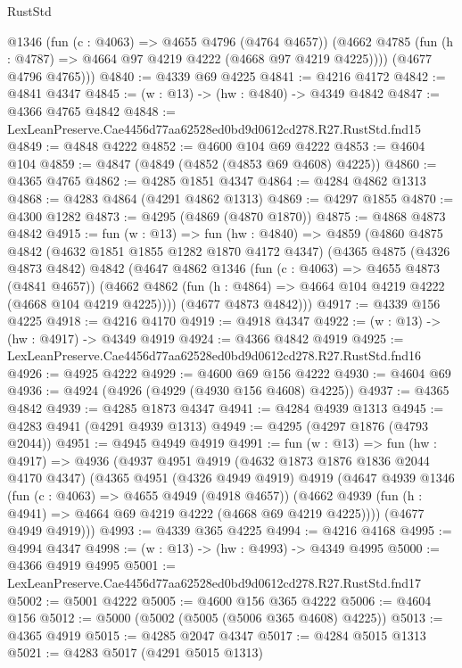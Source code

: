\begin{lexlean}{RustStd}
\begin{coremodule}
          @1346
          (fun (c : @4063) => @4655 @4796 (@4764 @4657))
          (@4662 @4785 (fun (h : @4787) => @4664 @97 @4219 @4222 (@4668 @97 @4219 @4225))))
        (@4677 @4796 @4765)))
@4840 := @4339 @69 @4225
@4841 := @4216 @4172
@4842 := @4841 @4347
@4845 := (w : @13) -> (hw : @4840) -> @4349 @4842
@4847 := @4366 @4765 @4842
@4848 := LexLeanPreserve.Cae4456d77aa62528ed0bd9d0612cd278.R27.RustStd.fnd15
@4849 := @4848 @4222
@4852 := @4600 @104 @69 @4222
@4853 := @4604 @104
@4859 := @4847 (@4849 (@4852 (@4853 @69 @4608) @4225))
@4860 := @4365 @4765
@4862 := @4285 @1851 @4347
@4864 := @4284 @4862 @1313
@4868 := @4283 @4864 (@4291 @4862 @1313)
@4869 := @4297 @1855
@4870 := @4300 @1282
@4873 := @4295 (@4869 (@4870 @1870))
@4875 := @4868 @4873 @4842
@4915 := fun (w : @13) =>
  fun (hw : @4840) =>
  @4859
    (@4860
      @4875
      @4842
      (@4632 @1851 @1855 @1282 @1870 @4172 @4347)
      (@4365
        @4875
        (@4326 @4873 @4842)
        @4842
        (@4647
          @4862
          @1346
          (fun (c : @4063) => @4655 @4873 (@4841 @4657))
          (@4662 @4862 (fun (h : @4864) => @4664 @104 @4219 @4222 (@4668 @104 @4219 @4225))))
        (@4677 @4873 @4842)))
@4917 := @4339 @156 @4225
@4918 := @4216 @4170
@4919 := @4918 @4347
@4922 := (w : @13) -> (hw : @4917) -> @4349 @4919
@4924 := @4366 @4842 @4919
@4925 := LexLeanPreserve.Cae4456d77aa62528ed0bd9d0612cd278.R27.RustStd.fnd16
@4926 := @4925 @4222
@4929 := @4600 @69 @156 @4222
@4930 := @4604 @69
@4936 := @4924 (@4926 (@4929 (@4930 @156 @4608) @4225))
@4937 := @4365 @4842
@4939 := @4285 @1873 @4347
@4941 := @4284 @4939 @1313
@4945 := @4283 @4941 (@4291 @4939 @1313)
@4949 := @4295 (@4297 @1876 (@4793 @2044))
@4951 := @4945 @4949 @4919
@4991 := fun (w : @13) =>
  fun (hw : @4917) =>
  @4936
    (@4937
      @4951
      @4919
      (@4632 @1873 @1876 @1836 @2044 @4170 @4347)
      (@4365
        @4951
        (@4326 @4949 @4919)
        @4919
        (@4647
          @4939
          @1346
          (fun (c : @4063) => @4655 @4949 (@4918 @4657))
          (@4662 @4939 (fun (h : @4941) => @4664 @69 @4219 @4222 (@4668 @69 @4219 @4225))))
        (@4677 @4949 @4919)))
@4993 := @4339 @365 @4225
@4994 := @4216 @4168
@4995 := @4994 @4347
@4998 := (w : @13) -> (hw : @4993) -> @4349 @4995
@5000 := @4366 @4919 @4995
@5001 := LexLeanPreserve.Cae4456d77aa62528ed0bd9d0612cd278.R27.RustStd.fnd17
@5002 := @5001 @4222
@5005 := @4600 @156 @365 @4222
@5006 := @4604 @156
@5012 := @5000 (@5002 (@5005 (@5006 @365 @4608) @4225))
@5013 := @4365 @4919
@5015 := @4285 @2047 @4347
@5017 := @4284 @5015 @1313
@5021 := @4283 @5017 (@4291 @5015 @1313)

\end{coremodule}
\end{lexlean}
